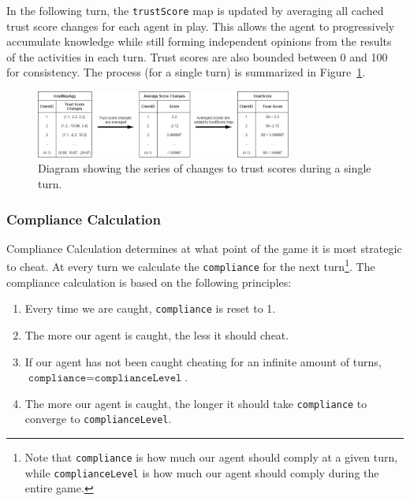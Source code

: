 In the following turn, the \texttt{trustScore} map is updated by averaging all cached trust score changes for each agent in play. This allows the agent to progressively accumulate knowledge while still forming independent opinions from the results of the activities in each turn. Trust scores are also bounded between 0 and 100 for consistency. The process (for a single turn) is summarized in Figure~\ref{fig:trust_scores}.\\

\begin{figure}[H] 
\centering
\includegraphics[width=0.75\textwidth]{11_team3_agentdesign/figures/TrustScores.jpg}
\caption{Diagram showing the series of changes to trust scores during a single turn.}
\label{fig:trust_scores}
\end{figure}


\subsubsection*{Compliance Calculation}
Compliance Calculation determines at what point of the game it is most strategic to cheat. At every turn we calculate the \texttt{compliance} for the next turn\footnote{Note that \texttt{compliance} is how much our agent should comply at a given turn, while \texttt{complianceLevel} is how much our agent should comply during the entire game.}. The compliance calculation is based on the following principles:
\begin{enumerate}
    \item Every time we are caught, \texttt{compliance} is reset to 1.
    \item The more our agent is caught, the less it should cheat.
    \item If our agent has not been caught cheating for an infinite amount of turns, $\texttt{compliance}=\texttt{complianceLevel}$.
    \item The more our agent is caught, the longer it should take \texttt{compliance} to converge to \texttt{complianceLevel}.
\end{enumerate}

